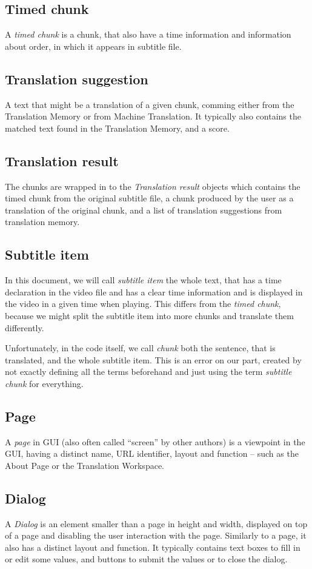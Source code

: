 \subsection*{Timed chunk}
A \emph{timed chunk} is a chunk, that also have a time information and information about order, in which it appears in subtitle file.

\subsection*{Translation suggestion}
A text that might be a translation of a given chunk, comming either from the Translation Memory or from Machine Translation. It typically also contains the matched text found in the Translation Memory, and a score.

\subsection*{Translation result}
The chunks are wrapped in to the \emph{Translation result} objects which contains the timed chunk from the original subtitle file, a chunk produced by the user as a translation of the original chunk, and a list of translation suggestions from translation memory.

\subsection*{Subtitle item}
In this document, we will call \emph{subtitle item} the whole text, that has a time declaration in the video file and has a clear time information and is displayed in the video in a given time when playing. This differs from the \emph{timed chunk}, because we might split the subtitle item into more chunks and translate them differently.

Unfortunately, in the code itself, we call \emph{chunk} both the sentence, that is translated, and the whole subtitle item. This is an error on our part, created by not exactly defining all the terms beforehand and just using the term \emph{subtitle chunk} for everything.

\subsection*{Page}
A \emph{page} in GUI (also often called ``screen'' by other authors) is a viewpoint in the GUI, having a distinct name, URL identifier, layout and function -- such as the About Page or the Translation Workspace.

\subsection*{Dialog}
A \emph{Dialog} is an element smaller than a page in height and width, displayed on top of a page and disabling the user interaction with the page. Similarly to a page, it also has a distinct layout and function. It typically contains text boxes to fill in or edit some values, and buttons to submit the values or to close the dialog.
